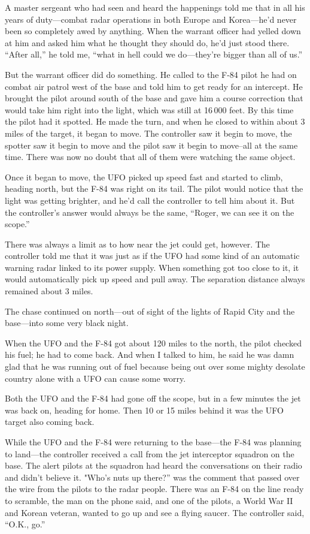 \begin{svgraybox}
A master sergeant who had seen and heard the happenings told me that
in all his years of duty---combat radar operations in both Europe and
Korea---he'd never been so completely awed by anything. When the
warrant officer had yelled down at him and asked him what he thought
they should do, he'd just stood there. ``After all,'' he told me, ``what
in hell could we do---they're bigger than all of us.''

But the warrant officer did do something. He called to the F-84
pilot he had on combat air patrol west of the base and told him to
get ready for an intercept. He brought the pilot around south of the
base and gave him a course correction that would take him right into
the light, which was still at 16\,000 feet. By this time the pilot had
it spotted. He made the turn, and when he closed to within about 3
miles of the target, it began to move. The controller saw it begin to
move, the spotter saw it begin to move and the pilot saw it begin to
move--all at the same time. There was now no doubt that all of them
were watching the same object.

Once it began to move, the UFO picked up speed fast and started to
climb, heading north, but the F-84 was right on its tail. The pilot
would notice that the light was getting brighter, and he'd call the
controller to tell him about it. But the controller's answer would
always be the same, ``Roger, we can see it on the scope.''

There was always a limit as to how near the jet could get, however.
The controller told me that it was just as if the UFO had some kind
of an automatic warning radar linked to its power supply. When
something got too close to it, it would automatically pick up speed
and pull away. The separation distance always remained about 3 miles.

The chase continued on north---out of sight of the lights of Rapid
City and the base---into some very black night.

When the UFO and the F-84 got about 120 miles to the north, the
pilot checked his fuel; he had to come back. And when I talked to
him, he said he was damn glad that he was running out of fuel because
being out over some mighty desolate country alone with a UFO can
cause some worry.

Both the UFO and the F-84 had gone off the scope, but in a few
minutes the jet was back on, heading for home. Then 10 or 15 miles
behind it was the UFO target also coming back.

While the UFO and the F-84 were returning to the base---the F-84 was
planning to land---the controller received a call from the jet
interceptor squadron on the base. The alert pilots at the squadron
had heard the conversations on their radio and didn't believe it.
"Who's nuts up there?'' was the comment that passed over the wire from
the pilots to the radar people. There was an F-84 on the line ready
to scramble, the man on the phone said, and one of the pilots, a
World War II and Korean veteran, wanted to go up and see a flying
saucer. The controller said, ``O.K., go.''


\end{svgraybox}
